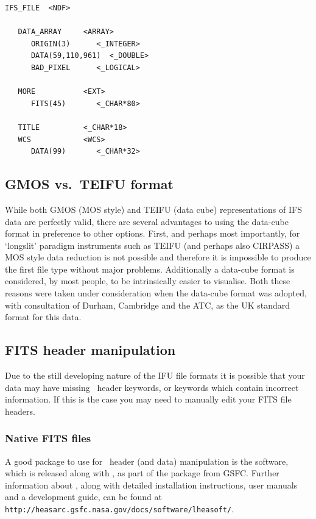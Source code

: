 \documentclass[twoside,11pt]{article}
\newcommand{\htmladdnormallink}[2]{#1}
\newcommand{\latex}[1]{#1}
\newcommand{\xlabel}[1]{}
\begin{document}
\small\begin{verbatim}
IFS_FILE  <NDF>

   DATA_ARRAY     <ARRAY>
      ORIGIN(3)      <_INTEGER>
      DATA(59,110,961)  <_DOUBLE>
      BAD_PIXEL      <_LOGICAL>  

   MORE           <EXT>
      FITS(45)       <_CHAR*80>

   TITLE          <_CHAR*18> 
   WCS            <WCS>      
      DATA(99)       <_CHAR*32>
\end{verbatim}\normalsize

\subsection{\xlabel{sc16_fits2ndf}GMOS vs.\ TEIFU format\label{sc16_fits2ndf}}

While both GMOS (MOS style) and TEIFU (data cube) representations of
IFS data are perfectly valid, there are several advantages to using the
data-cube format in preference to other options.  First, and perhaps
most importantly, for `longslit' paradigm instruments such as TEIFU
(and perhaps also CIRPASS) a MOS style data reduction is not possible
and therefore it is impossible to produce the first file type without
major problems.  Additionally a data-cube format is considered, by most
people, to be intrinsically easier to visualise.  Both these reasons
were taken under consideration when the data-cube format was adopted,
with consultation of Durham, Cambridge and the ATC, as the UK standard
format for this data.

\subsection{\xlabel{sc16_fitshdr}FITS header manipulation\label{sc16_fitshdr}}

Due to the still developing nature of the IFU file formats it is
possible that your data may have missing \FITSref\  header keywords, or
keywords which contain incorrect information.  If this is the case you
may need to manually edit your FITS file headers.

\subsubsection{Native FITS files}
 
A good package to use for \FITSref\ header (and data) manipulation is the
\htmladdnormallink{\FTOOLS}{
http://heasarc.gsfc.nasa.gov/docs/software/lheasoft/ftools/} software,
which is released along with
\htmladdnormallink{\XANADU}{http://heasarc.gsfc.nasa.gov/docs/software/lheasoft/xanadu/},
as part of the
\htmladdnormallink{\HEASOFT}{http://heasarc.gsfc.nasa.gov/docs/software/lheasoft/}
package from GSFC.\latex{ Further information about \HEASOFT, along
with detailed installation instructions, user manuals and a
development guide, can be found at {\tt
http://heasarc.gsfc.nasa.gov/docs/software/lheasoft/}.}
\end{document}
